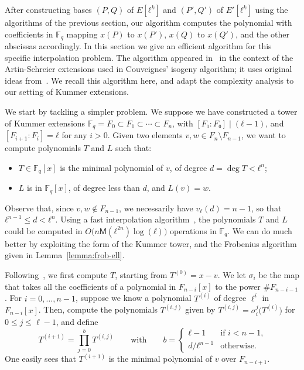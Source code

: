 \documentclass{lms}
\def\cout#1{\mathsf{#1}}
\newcommand{\F}{\mathbb{F}}
\newcommand{\MM}{\cout{M}}
\begin{document}
After constructing bases $(P,Q)$ of $E[ℓ^k]$ and $(P',Q')$ of
$E'[ℓ^k]$ using the algorithms of the previous section, our algorithm
computes the polynomial with coefficients in $\F_q$ mapping $x(P)$ to
$x(P')$, $x(Q)$ to $x(Q')$, and the other abscissas accordingly.  In
this section we give an efficient algorithm for this specific
interpolation problem. The algorithm appeared in~\cite{df10} in the
context of the Artin-Schreier extensions used in Couveignes' isogeny
algorithm; it uses original ideas from~\cite{enge+morain03}. We recall
this algorithm here, and adapt the complexity analysis to our setting 
of Kummer extensions.


We start by tackling a simpler problem. We suppose we have constructed
a tower of Kummer extensions $\F_q=F_0⊂F_1⊂\cdots⊂F_n$, with
$[F₁:F₀]\mid(ℓ-1)$, and $[F_{i+1}:F_i]=ℓ$ for any $i>0$. Given two
elements $v,w∈F_n\setminus F_{n-1}$, we want to compute polynomials
$T$ and $L$ such that:
\begin{itemize}
\item $T \in \F_q[x]$ is the minimal polynomial of $v$, of degree
  $d=\deg T<ℓ^n$;
\item $L$ is in $\F_q[x]$, of degree less than $d$, and $L(v)=w$.
\end{itemize}
Observe that, since $v,w∉F_{n-1}$, we necessarily have $v_ℓ(d)=n-1$,
so that $ℓ^{n-1}≤d<ℓ^n$.
Using a fast interpolation algorithm~\cite[Chapter~10.2]{vzGG}, the
polynomials $T$ and $L$ could be computed in
$O\bigl(n\MM(ℓ^{2n})\log(ℓ)\bigr)$ operations in $\F_q$. We can do
much better by exploiting the form of the Kummer tower, and the
Frobenius algorithm given in Lemma~\ref{lemma:frob-ell}.

Following~\cite{df10}, we first compute $T$, starting from
$T^{(0)}=x-v$.  We let $\sigma_i$ be the map that takes all the
coefficients of a polynomial in $F_{n-i}[x]$ to the power
$\#F_{n-i-1}$. For $i=0,\dots,n-1$, suppose we know a polynomial
$T^{(i)}$ of degree $\ell^i$ in $F_{n-i}[x]$. Then, compute the
polynomials $T^{(i,j)}$ given by
$T^{(i,j)}= \sigma_i^j\bigl (T^{(i)} \bigr)$
for $0 \le j \le \ell-1$,
and define
\begin{equation}
  \label{eq:interp}
  T^{(i+1)}=\prod_{j=0}^{b} T^{(i,j)}
  \qquad\text{with}\qquad
  b = \begin{cases}
    ℓ-1 &\text{if $i<n-1$,}\\
    d/ℓ^{n-1} &\text{otherwise.}
  \end{cases}
\end{equation}
One easily sees that
$T^{(i+1)}$ is the minimal polynomial of $v$ over $F_{n-i+1}$.
\end{document}
